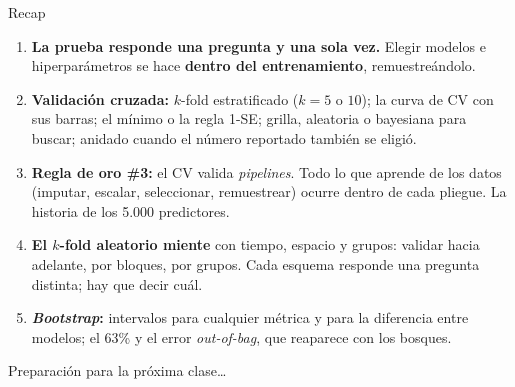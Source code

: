 \documentclass{beamer}
\newcommand{\1}{\mathbb{I}}
\begin{document}
\begin{frame}{Recap}
\small
\begin{enumerate}\itemsep6pt
  \item \textbf{La prueba responde una pregunta y una sola vez.} Elegir modelos e hiperparámetros se hace \textbf{dentro del entrenamiento}, remuestreándolo.
  \item \textbf{Validación cruzada:} $k$-fold estratificado ($k = 5$ o $10$); la curva de CV con sus barras; el mínimo o la regla 1-SE; grilla, aleatoria o bayesiana para buscar; anidado cuando el número reportado también se eligió.
  \item \textbf{Regla de oro \#3:} el CV valida \emph{pipelines}. Todo lo que aprende de los datos (imputar, escalar, seleccionar, remuestrear) ocurre dentro de cada pliegue. La historia de los 5.000 predictores.
  \item \textbf{El $k$-fold aleatorio miente} con tiempo, espacio y grupos: validar hacia adelante, por bloques, por grupos. Cada esquema responde una pregunta distinta; hay que decir cuál.
  \item \textbf{\emph{Bootstrap}:} intervalos para cualquier métrica y para la diferencia entre modelos; el 63\% y el error \emph{out-of-bag}, que reaparece con los bosques.
\end{enumerate}
\end{frame}

\begin{frame}
\vspace{2.0cm}
\Large{Preparación para la próxima clase\ldots}
\end{frame}

\end{document}
